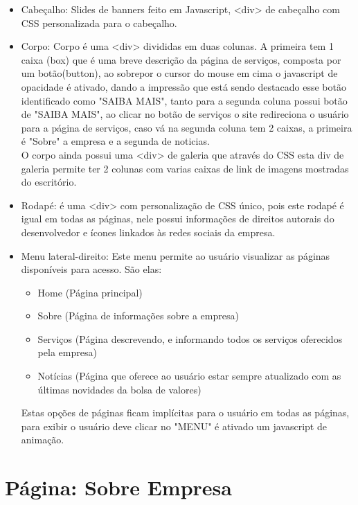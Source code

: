 \documentclass[
	12pt,				%
    oneside,			%
	a4paper,			%
	english,			%
	french,				%
	spanish,			%
	brazil,				%
	]{abntex2}
\begin{document}
\begin{itemize}
	\item{Cabeçalho: Slides de banners feito em Javascript, <div> de cabeçalho com CSS personalizada para o cabeçalho.}
	\item{Corpo: Corpo é uma <div> divididas em duas colunas. A primeira tem 1 caixa (box) que é uma breve descrição da página de serviços, composta por um botão(button), ao sobrepor o cursor do mouse em cima o javascript de opacidade é ativado, dando a impressão que está sendo destacado esse botão identificado como "SAIBA MAIS", tanto para a segunda coluna possui botão de "SAIBA MAIS", ao clicar no botão de serviços o site redireciona o usuário para a página de serviços, caso vá na segunda coluna tem 2 caixas, a primeira é "Sobre" a empresa e a segunda de noticias. \\ O corpo ainda possui uma <div> de galeria que através do CSS esta div de galeria permite ter 2 colunas com varias caixas de link de imagens mostradas do escritório.}
	\item{Rodapé: é uma <div> com personalização de CSS único, pois este rodapé é igual em todas as páginas, nele possui informações de direitos autorais do desenvolvedor e ícones linkados às redes sociais da empresa.}
	
	\item{Menu lateral-direito: Este menu permite ao usuário visualizar as páginas disponíveis para acesso. São elas: 
	
	\begin{itemize}
			
	\item{Home (Página principal)}
	\item{Sobre (Página de informações sobre a empresa)}
	\item{Serviços (Página descrevendo, e informando todos os serviços oferecidos pela empresa)} 		    \item{Notícias (Página que oferece ao usuário estar sempre atualizado com as últimas novidades da bolsa de valores)}
	
	\end{itemize}
	
	Estas opções de páginas ficam implícitas para o usuário em todas as páginas, para exibir o usuário deve clicar no "MENU" é ativado um javascript de animação.
}
\end{itemize}

\chapter{Página: Sobre Empresa}
\end{document}
